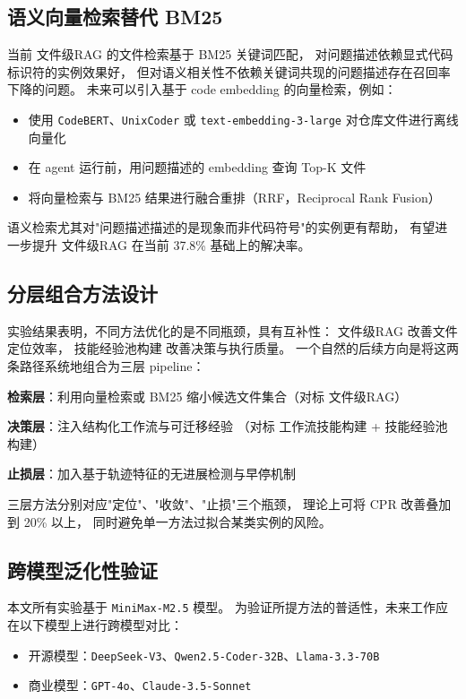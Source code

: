 \subsection{语义向量检索替代 BM25}
\label{subsec:future-embedding}

当前 文件级RAG 的文件检索基于 BM25 关键词匹配，
对问题描述依赖显式代码标识符的实例效果好，
但对语义相关性不依赖关键词共现的问题描述存在召回率下降的问题。
未来可以引入基于 code embedding 的向量检索，例如：

\begin{itemize}
  \item 使用 \texttt{CodeBERT}、\texttt{UnixCoder} 或
        \texttt{text-embedding-3-large} 对仓库文件进行离线向量化
  \item 在 agent 运行前，用问题描述的 embedding 查询 Top-K 文件
  \item 将向量检索与 BM25 结果进行融合重排（RRF，Reciprocal Rank Fusion）
\end{itemize}

语义检索尤其对"问题描述描述的是现象而非代码符号"的实例更有帮助，
有望进一步提升 文件级RAG 在当前 37.8\% 基础上的解决率。

\subsection{分层组合方法设计}
\label{subsec:future-pipeline}

实验结果表明，不同方法优化的是不同瓶颈，具有互补性：
文件级RAG 改善文件定位效率，
技能经验池构建 改善决策与执行质量。
一个自然的后续方向是将这两条路径系统地组合为三层 pipeline：

  \textbf{检索层}：利用向量检索或 BM25 缩小候选文件集合（对标 文件级RAG）
  
  \textbf{决策层}：注入结构化工作流与可迁移经验
        （对标 工作流技能构建 + 技能经验池构建）
        
  \textbf{止损层}：加入基于轨迹特征的无进展检测与早停机制

三层方法分别对应"定位"、"收敛"、"止损"三个瓶颈，
理论上可将 CPR 改善叠加到 20\% 以上，
同时避免单一方法过拟合某类实例的风险。

\subsection{跨模型泛化性验证}
\label{subsec:future-model-transfer}

本文所有实验基于 \texttt{MiniMax-M2.5} 模型。
为验证所提方法的普适性，未来工作应在以下模型上进行跨模型对比：
\begin{itemize}
  \item 开源模型：\texttt{DeepSeek-V3}、\texttt{Qwen2.5-Coder-32B}、\texttt{Llama-3.3-70B}
  \item 商业模型：\texttt{GPT-4o}、\texttt{Claude-3.5-Sonnet}
\end{itemize}


